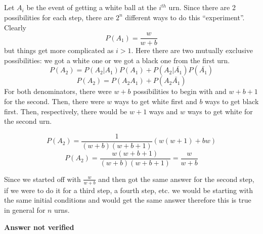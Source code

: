 \subsection{}
Let $A_i$ be the event of getting a white ball at the $i^{th}$ urn.   Since there are 2 possibilities for each step, there are $2^n$ different ways to do this ``experiment''.  Clearly
\begin{equation}
	P(A_1) = \frac{w}{w+b}
\end{equation}
but things get more complicated as $i>1$.  Here there are two mutually exclusive possibilities: we got a white one or we got a black one from the first urn.  
\begin{equation}
	P(A_2) = P(A_2|A_1)P(A_1) + P(A_2|\bar{A_1})P(\bar{A_1})
\end{equation}
\begin{equation}
	P(A_2) = P(A_2A_1) + P(A_2\bar{A_1})
\end{equation}
For both denominators, there were $w+b$ possibilities to begin with and $w+b+1$ for the second.   Then, there were $w$ ways to get white first and $b$ ways to get black first.  Then, respectively, there would be $w+1$ ways and $w$ ways to get white for the second urn. 

\begin{equation}
	P(A_2) = \frac{1}{(w+b)(w+b+1)} \left( w(w+1) + bw \right)
\end{equation}
\begin{equation}
	P(A_2) = \frac{w(w+b+1)}{(w+b)(w+b+1)} = \frac{w}{w+b}
\end{equation}

Since we started off with $\frac{w}{w+b}$ and then got the same answer for the second step, if we were to do it for a third step, a fourth step, etc. we would be starting with the same initial conditions and would get the same answer therefore this is true in general for $n$ urns.

\textbf{Answer not verified}

